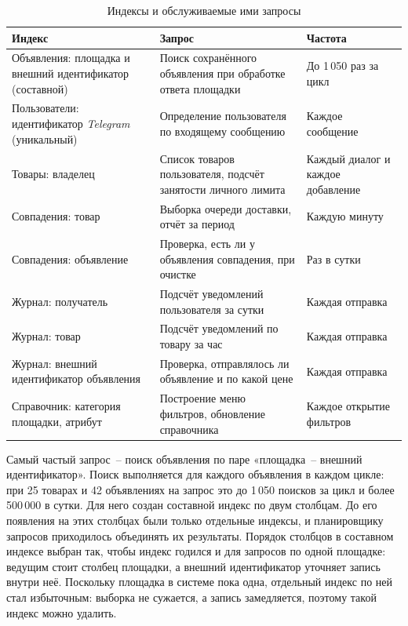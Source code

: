 \begin{table}[ht]
\caption{Индексы и обслуживаемые ими запросы}
\label{table:development:indexes}
\centering
	\begin{tabular}{|>{\raggedright}m{}
	                |>{\raggedright}m{}
	                |>{\raggedright\arraybackslash}m{}|}
	\hline
	\centering Индекс & \centering Запрос & \centering\arraybackslash Частота \\
	\hline Объявления: площадка и внешний идентификатор (составной) & Поиск сохранённого объявления при обработке ответа площадки & До 1\,050 раз за цикл \\
	\hline Пользователи: идентификатор \textit{Telegram} (уникальный) & Определение пользователя по входящему сообщению & Каждое сообщение \\
	\hline Товары: владелец & Список товаров пользователя, подсчёт занятости личного лимита & Каждый диалог и каждое добавление \\
	\hline Совпадения: товар & Выборка очереди доставки, отчёт за период & Каждую минуту \\
	\hline Совпадения: объявление & Проверка, есть ли у объявления совпадения, при очистке & Раз в сутки \\
	\hline Журнал: получатель & Подсчёт уведомлений пользователя за сутки & Каждая отправка \\
	\hline Журнал: товар & Подсчёт уведомлений по товару за час & Каждая отправка \\
	\hline Журнал: внешний идентификатор объявления & Проверка, отправлялось ли объявление и по какой цене & Каждая отправка \\
	\hline Справочник: категория площадки, атрибут & Построение меню фильтров, обновление справочника & Каждое открытие фильтров \\
	\hline
	\end{tabular}
\end{table}

Самый частый запрос~-- поиск объявления по паре «площадка~-- внешний идентификатор». Поиск выполняется для каждого объявления в каждом цикле: при 25 товарах и 42 объявлениях на запрос это до 1\,050 поисков за цикл и более 500\,000 в сутки. Для него создан составной индекс по двум столбцам. До его появления на этих столбцах были только отдельные индексы, и планировщику запросов приходилось объединять их результаты. Порядок столбцов в составном индексе выбран так, чтобы индекс годился и для запросов по одной площадке: ведущим стоит столбец площадки, а внешний идентификатор уточняет запись внутри неё. Поскольку площадка в системе пока одна, отдельный индекс по ней стал избыточным: выборка не сужается, а запись замедляется, поэтому такой индекс можно удалить.

